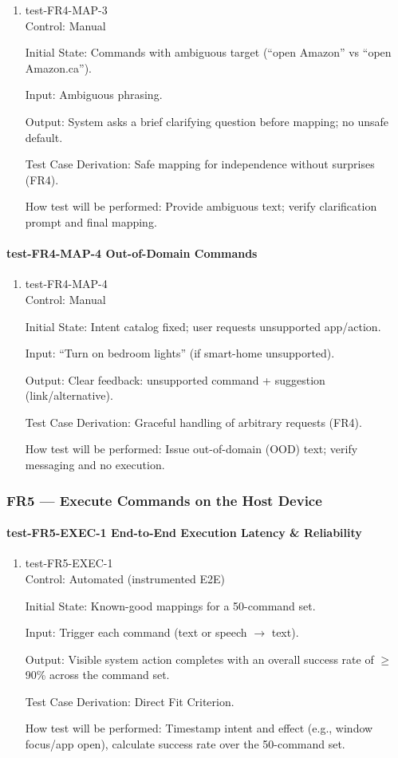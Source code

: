 \documentclass[12pt, titlepage]{article}
\begin{document}
\begin{enumerate}
\item{test-FR4-MAP-3\\}
Control: Manual

Initial State: Commands with ambiguous target (“open Amazon” vs “open Amazon.ca”).

Input: Ambiguous phrasing.

Output: System asks a brief clarifying question before mapping; no unsafe default.

Test Case Derivation: Safe mapping for independence without surprises (FR4).

How test will be performed: Provide ambiguous text; verify clarification prompt and final mapping.
\end{enumerate}

\paragraph{test-FR4-MAP-4 Out-of-Domain Commands}

\begin{enumerate}
\item{test-FR4-MAP-4\\}
Control: Manual

Initial State: Intent catalog fixed; user requests unsupported app/action.

Input: “Turn on bedroom lights” (if smart-home unsupported).

Output: Clear feedback: unsupported command + suggestion (link/alternative).

Test Case Derivation: Graceful handling of arbitrary requests (FR4).

How test will be performed: Issue out-of-domain (OOD) text; verify messaging and no execution.
\end{enumerate}

\subsubsection{FR5 — Execute Commands on the Host Device}

\paragraph{test-FR5-EXEC-1 End-to-End Execution Latency \& Reliability}

\begin{enumerate}
\item{test-FR5-EXEC-1\\}
Control: Automated (instrumented E2E)

Initial State: Known-good mappings for a 50-command set.

Input: Trigger each command (text or speech $\rightarrow$ text).

Output: Visible system action completes with an overall success rate of $\geq$90\% across the command set.

Test Case Derivation: Direct Fit Criterion.

How test will be performed: Timestamp intent and effect (e.g., window focus/app open), calculate success rate over the 50-command set.
\end{enumerate}
\end{document}
